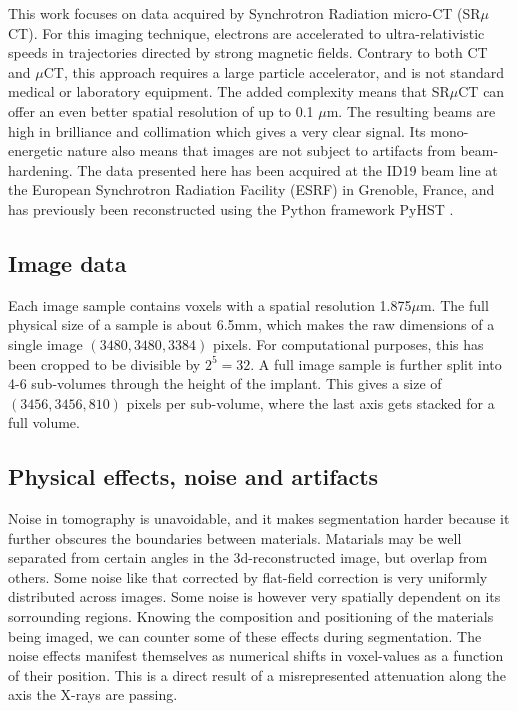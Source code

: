 This work focuses on data acquired by Synchrotron Radiation micro-CT (SR$\mu$CT). For this imaging
technique, electrons are accelerated to ultra-relativistic speeds in trajectories directed by strong
magnetic fields. Contrary to both CT and $\mu$CT, this approach requires a large particle accelerator,
and is not standard medical or laboratory equipment. The added complexity means that SR$\mu$CT can
offer an even better spatial resolution of up to 0.1 $\mu$m. The resulting beams are high in
brilliance and collimation which gives a very clear signal. Its mono-energetic nature also means
that images are not subject to artifacts from beam-hardening.
The data presented here has been
acquired at the ID19 beam line at the European Synchrotron Radiation Facility (ESRF) in Grenoble,
France, and has previously  been reconstructed using the Python
framework PyHST \citep{pyhst}.

\subsection{Image data}

Each image sample contains voxels with a spatial resolution 1.875$\mu$m. The full physical size of
a sample is about 6.5mm, which makes the raw dimensions of a single image $(3480,3480,3384)$ pixels.
For computational purposes, this has been cropped to be divisible by $2^5=32$. A full image sample
is further split into 4-6 sub-volumes through the height of the implant. This gives a size of
$(3456,3456,810)$ pixels per sub-volume, where the last axis gets stacked for a full volume.
 

\subsection{Physical effects, noise and artifacts}\label{sec:physics}

Noise in tomography is unavoidable, and it makes segmentation harder because it further obscures
the boundaries between materials. Matarials may be well separated from certain angles in the
3d-reconstructed image, but overlap from others. Some noise like that corrected by flat-field
correction is very uniformly distributed across images. Some noise is however very spatially
dependent on its sorrounding regions. Knowing the composition and positioning of the materials
being imaged, we can counter some of these effects during segmentation. The noise effects manifest
themselves as numerical shifts in voxel-values as a function of their position. This is a direct
result of a misrepresented attenuation along the axis the X-rays are passing.


